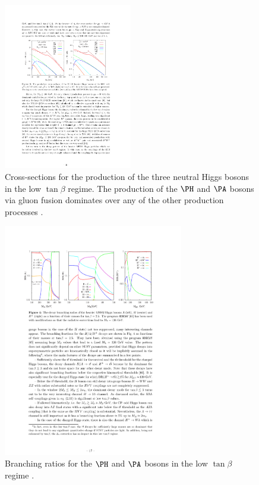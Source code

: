 \begin{figure}[htbp]
   \includegraphics[width=0.5\textwidth]{plots/theory/XS_lowtanb.pdf}
\caption[Cross-sections for the production of the three neutral Higgs bosons in
the low $\tan\beta$ regime.]{Cross-sections for the production of the three neutral Higgs bosons in
the low $\tan\beta$ regime. The production of the $\PH$ and $\PA$ bosons
via gluon fusion dominates over any of the other production processes \cite{Djouadi:2013vqa}.}
\label{fig:XSlowtanb}
\end{figure}

\begin{figure}[htbp]
   \includegraphics[width=0.7\textwidth]{plots/theory/BR_lowtanb.pdf}
\caption[Branching ratios for the $\PH$ and $\PA$ bosons in the low $\tan\beta$
regime.]{Branching ratios for the $\PH$ and $\PA$ bosons in the low $\tan\beta$
regime \cite{Djouadi:2013vqa}.}
\label{fig:BRlowtanb}
\end{figure}

